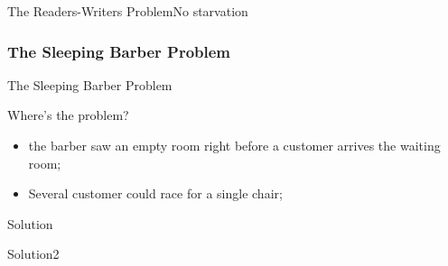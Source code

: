 \begin{frame}{The Readers-Writers Problem}{No starvation}
  \centering
\end{frame}

\subsubsection{The Sleeping Barber Problem}
\label{sec:sleep-barb-probl}

\begin{frame}{The Sleeping Barber Problem}
  \begin{minipage}[m]{.35\linewidth}
  \end{minipage}\quad
  \begin{minipage}[m]{.6\linewidth}
    \begin{block}{Where's the problem?}
      \begin{itemize}
      \item the barber saw an empty room right before a customer arrives the waiting room;
      \item Several customer could race for a single chair;
      \end{itemize}
    \end{block}
  \end{minipage}
\end{frame}

\begin{frame}{Solution}
  \centering
\end{frame}

\begin{frame}{Solution2}
  \centering
\end{frame}

\begin{frame}
  \begin{refsection}
    \nocite{wiki:ipc, wiki:semaphore}
    \printbibliography[heading=none]
  \end{refsection}
\end{frame}

